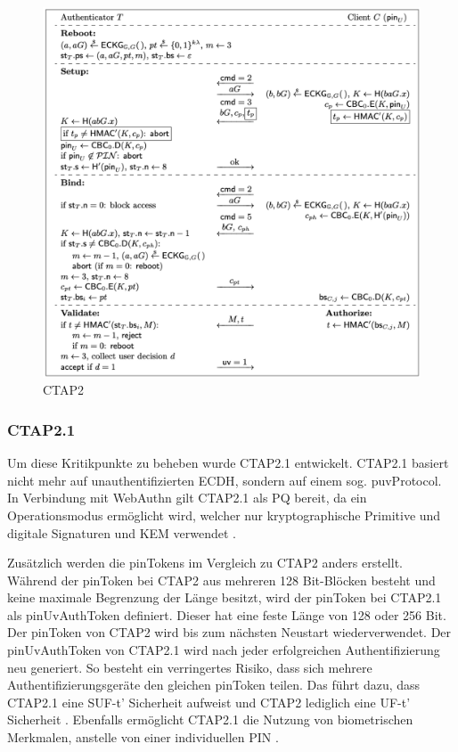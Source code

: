 \begin{figure}[H]
	\centering 
	\includegraphics[width=1\textwidth]{img/abbildungen/ctap2-process.png}
	\captionsetup{format=hang}
	\caption{CTAP2} \label{ctap2-process}
\end{figure}

\subsubsection*{CTAP2.1}
Um diese Kritikpunkte zu beheben wurde CTAP2.1 entwickelt. CTAP2.1 basiert nicht mehr auf unauthentifizierten \ac{ECDH}, sondern auf einem sog. \ac{puvProtocol}. In Verbindung mit WebAuthn gilt CTAP2.1 als \ac{PQ} bereit, da ein Operationsmodus ermöglicht wird, welcher nur kryptographische Primitive und digitale Signaturen und \ac{KEM} verwendet \cite{bindel2022fido2}.

Zusätzlich werden die pinTokens im Vergleich zu \ac{CTAP2} anders erstellt. Während der pinToken bei \ac{CTAP2} aus mehreren 128 Bit-Blöcken besteht und keine maximale Begrenzung der Länge besitzt, wird der pinToken bei CTAP2.1 als pinUvAuthToken definiert. Dieser hat eine feste Länge von 128 oder 256 Bit. Der pinToken von \ac{CTAP2} wird bis zum nächsten Neustart wiederverwendet. Der pinUvAuthToken von CTAP2.1 wird nach jeder erfolgreichen Authentifizierung neu generiert. So besteht ein verringertes Risiko, dass sich mehrere Authentifizierungsgeräte den gleichen pinToken teilen. Das führt dazu, dass CTAP2.1 eine \ac{SUF}-t' Sicherheit aufweist und \ac{CTAP2} lediglich eine \ac{UF}-t' Sicherheit \cite{bindel2022fido2}. Ebenfalls ermöglicht CTAP2.1 die Nutzung von biometrischen Merkmalen, anstelle von einer individuellen PIN \cite{bindel2022fido2}.


